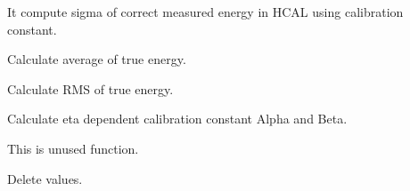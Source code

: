 \documentclass{cernrep}
\begin{document}

It compute sigma of correct measured energy in HCAL using calibration constant.


Calculate average of true energy.


Calculate RMS of true energy.


Calculate eta dependent calibration constant Alpha and Beta.


This is unused function.


Delete values.
\end{document}
